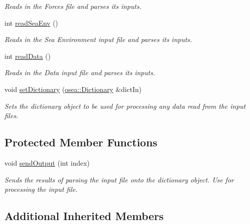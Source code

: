 \begin{DoxyCompactItemize}
\begin{DoxyCompactList}\small\item\em Reads in the Forces file and parses its inputs. \end{DoxyCompactList}\item 
int \hyperlink{classosea_1_1_file_reader_a1f8a6bd4b5c53f80cc94d64d6dd1f2da}{read\-Sea\-Env} ()
\begin{DoxyCompactList}\small\item\em Reads in the Sea Environment input file and parses its inputs. \end{DoxyCompactList}\item 
int \hyperlink{classosea_1_1_file_reader_a814f8b06adcc190d4042509797eef6d2}{read\-Data} ()
\begin{DoxyCompactList}\small\item\em Reads in the Data input file and parses its inputs. \end{DoxyCompactList}\item 
void \hyperlink{classosea_1_1_file_reader_a3cbdb7eab632abafcfd055aa92f47b73}{set\-Dictionary} (\hyperlink{classosea_1_1_dictionary}{osea\-::\-Dictionary} \&dict\-In)
\begin{DoxyCompactList}\small\item\em Sets the dictionary object to be used for processing any data read from the input files. \end{DoxyCompactList}\end{DoxyCompactItemize}
\subsection*{Protected Member Functions}
\begin{DoxyCompactItemize}
\item 
void \hyperlink{classosea_1_1_file_reader_aa57b483154b47ad0126d97debb53c638}{send\-Output} (int index)
\begin{DoxyCompactList}\small\item\em Sends the results of parsing the input file onto the dictionary object. Use for processing the input file. \end{DoxyCompactList}\end{DoxyCompactItemize}
\subsection*{Additional Inherited Members}


